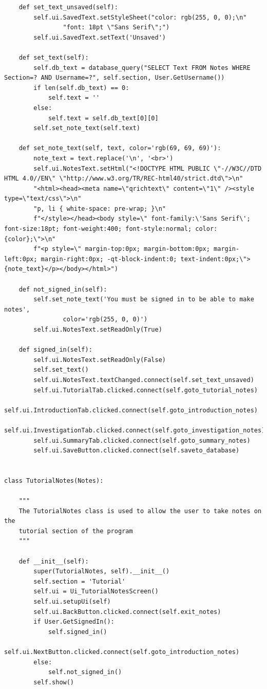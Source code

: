 \documentclass[12pt]{article}
\begin{document}
\begin{lstlisting}
    def set_text_unsaved(self):
        self.ui.SavedText.setStyleSheet("color: rgb(255, 0, 0);\n"
                "font: 18pt \"Sans Serif\";")
        self.ui.SavedText.setText('Unsaved')

    def set_text(self):
        self.db_text = database_query("SELECT Text FROM Notes WHERE Section=? AND Username=?", self.section, User.GetUsername())
        if len(self.db_text) == 0:
            self.text = ''
        else:
            self.text = self.db_text[0][0]
        self.set_note_text(self.text)

    def set_note_text(self, text, color='rgb(69, 69, 69)'):
        note_text = text.replace('\n', '<br>')
        self.ui.NotesText.setHtml("<!DOCTYPE HTML PUBLIC \"-//W3C//DTD HTML 4.0//EN\" \"http://www.w3.org/TR/REC-html40/strict.dtd\">\n"
        "<html><head><meta name=\"qrichtext\" content=\"1\" /><style type=\"text/css\">\n"
        "p, li { white-space: pre-wrap; }\n"
        f"</style></head><body style=\" font-family:\'Sans Serif\'; font-size:18pt; font-weight:400; font-style:normal; color:{color};\">\n"
        f"<p style=\" margin-top:0px; margin-bottom:0px; margin-left:0px; margin-right:0px; -qt-block-indent:0; text-indent:0px;\">{note_text}</p></body></html>")

    def not_signed_in(self):
        self.set_note_text('You must be signed in to be able to make notes',
                color='rgb(255, 0, 0)')
        self.ui.NotesText.setReadOnly(True)

    def signed_in(self):
        self.ui.NotesText.setReadOnly(False)
        self.set_text()
        self.ui.NotesText.textChanged.connect(self.set_text_unsaved)
        self.ui.TutorialTab.clicked.connect(self.goto_tutorial_notes)
        self.ui.IntroductionTab.clicked.connect(self.goto_introduction_notes)
        self.ui.InvestigationTab.clicked.connect(self.goto_investigation_notes)
        self.ui.SummaryTab.clicked.connect(self.goto_summary_notes)
        self.ui.SaveButton.clicked.connect(self.saveto_database)


class TutorialNotes(Notes):

    """
    The TutorialNotes class is used to allow the user to take notes on the
    tutorial section of the program
    """

    def __init__(self):
        super(TutorialNotes, self).__init__()
        self.section = 'Tutorial'
        self.ui = Ui_TutorialNotesScreen()
        self.ui.setupUi(self)
        self.ui.BackButton.clicked.connect(self.exit_notes)
        if User.GetSignedIn():
            self.signed_in()
            self.ui.NextButton.clicked.connect(self.goto_introduction_notes)
        else:
            self.not_signed_in()
        self.show()



\end{lstlisting}
\end{document}
